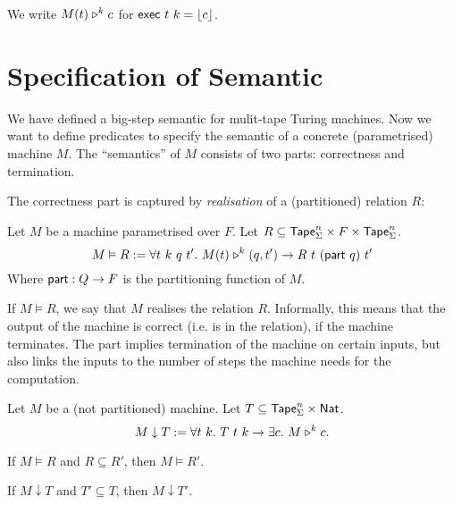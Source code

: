 We write $M(t) \mathrel{\triangleright}^k c$ for $\textsf{exec}~t~k = \left\lfloor {c}\right\rfloor$.


\section{Specification of Semantic}
\label{sec:spec_semantics}

We have defined a big-step semantic for mulit-tape Turing machines.  Now we want to define predicates to specify the semantic of a concrete
(parametrised) machine $M$.  The ``semantics'' of $M$ consists of two parts:  correctness and termination.

The correctness part is captured by \emph{realisation} of a (partitioned) relation $R$:

\begin{definition}[Realisation]
  \label{def:realisation}
  Let $M$ be a machine parametrised over $F$.  Let $R \subseteq \textsf{Tape}_\Sigma^n \times F \times \textsf{Tape}_\Sigma^n$.
  \[
    M \vDash R :=
    \forall t~k~q~t'.~M(t) \mathrel{\triangleright}^k (q, t') \rightarrow
    R~t~(\textsf{part}~q)~t'
  \]
  Where $\textsf{part} : Q \rightarrow F$ is the partitioning function of $M$.
\end{definition}

If $M \vDash R$, we say that $M$ realises the relation $R$.  Informally, this means that the output of the machine is correct (i.e. is in the
relation), if the machine terminates.  The part implies termination of the machine on certain inputs, but also links the inputs to the number of steps
the machine needs for the computation.

\begin{definition}
  \label{def:termination}
  Let $M$ be a (not partitioned) machine.  Let $T \subseteq \textsf{Tape}_\Sigma^n \times \textsf{Nat}$.
  \[
    M \downarrow T :=
    \forall t~k.~T~t~k \rightarrow
    \exists c.~M \mathrel{\triangleright}^k c.
  \]
\end{definition}


\begin{lemma}
  \label{lem:Realise_monotone}
  If $M \vDash R$ and $R \subseteq R'$, then $M \vDash R'$.
\end{lemma}

\begin{lemma}
  \label{lem:TerminatesIn_monotone}
  If $M \downarrow T$ and $T' \subseteq T$, then $M \downarrow T'$.
\end{lemma}


